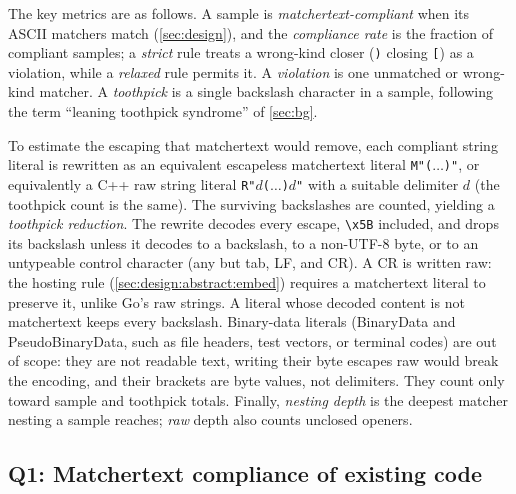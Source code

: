 The key metrics are as follows.
A sample is \emph{matchertext-compliant}
when its ASCII matchers match (\cref{sec:design}),
and the \emph{compliance rate} is the fraction of compliant samples;
a \emph{strict} rule treats a wrong-kind closer (\eg \verb|)| closing \verb|[|)
as a violation, while a \emph{relaxed} rule permits it.
A \emph{violation} is one unmatched or wrong-kind matcher.
A \emph{toothpick} is a single backslash character in a sample,
following the term ``leaning toothpick syndrome'' of \cref{sec:bg}.

To estimate the escaping that matchertext would remove,
each compliant string literal is rewritten
as an equivalent escapeless matchertext literal \verb|M"(|$\dots$\verb|)"|,
or equivalently a C++ raw string literal \verb|R"|$d$\verb|(|$\dots$\verb|)|$d$\verb|"|
with a suitable delimiter $d$ (the toothpick count is the same).
The surviving backslashes are counted,
yielding a \emph{toothpick reduction}.
The rewrite decodes every escape, \verb|\x5B| included,
and drops its backslash unless it decodes to a backslash, to a non-UTF-8 byte,
or to an untypeable control character (any but tab, LF, and CR).
A CR is written raw: the hosting rule (\cref{sec:design:abstract:embed})
requires a matchertext literal to preserve it,
unlike Go's raw strings.
A literal whose decoded content is not matchertext keeps every backslash.
Binary-data literals (BinaryData and PseudoBinaryData,
such as file headers, test vectors, or terminal codes) are out of scope:
they are not readable text, writing their byte escapes raw would break the encoding,
and their brackets are byte values, not delimiters.
They count only toward sample and toothpick totals.
Finally, \emph{nesting depth} is the deepest matcher nesting a sample reaches;
\emph{raw} depth also counts unclosed openers.


\subsection{Q1: Matchertext compliance of existing code}
\label{sec:eval:compliance}

